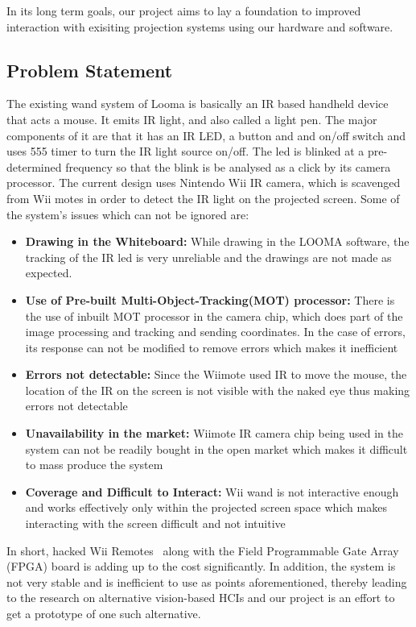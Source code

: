 \documentclass[12pt, a4paper]{article}
\begin{document}
In its long term goals, our project aims to lay a foundation to improved interaction with exisiting projection systems using our hardware and software. 

\subsection{Problem Statement}
The existing wand system of Looma is basically an IR based handheld device that acts a mouse. It emits IR light, and also called a light pen. The major components of it are that it has an IR LED, a button and and on/off switch and uses 555 timer to turn the IR light source on/off. The led is blinked at a pre-determined frequency so that the blink is be analysed as a click by its camera processor. The current design uses Nintendo Wii IR camera, which is scavenged from Wii motes in order to detect the IR light on the projected screen. Some of the system's issues which can not be ignored are:

\begin{itemize}
\item \textbf {Drawing in the Whiteboard:} While drawing in the LOOMA software, the tracking of the IR led is very unreliable and the drawings are not made as expected.
\item \textbf{Use of Pre-built Multi-Object-Tracking(MOT) processor:} There is the use of inbuilt MOT processor in the camera chip, which does part of the image processing and tracking and sending coordinates. In the case of errors, its response can not be modified to remove errors which makes it inefficient
\item \textbf{Errors not detectable:} Since the Wiimote used IR to move the mouse, the location of the IR on the screen is not visible with the naked eye thus making errors not detectable 
\item \textbf{Unavailability in the market:} Wiimote IR camera chip being used in the system can not be readily bought in the open market which makes it difficult to mass produce the system
\item \textbf{Coverage and Difficult to Interact:} Wii wand is not interactive enough and works effectively only within the projected screen space which makes interacting with the screen difficult and not intuitive
\end{itemize}

In short, hacked Wii Remotes~\cite{joh} along with the Field Programmable Gate Array (FPGA) board is adding up to the cost significantly. In addition, the system is not very stable and is inefficient to use as points aforementioned, thereby leading to the research on alternative vision-based HCIs and our project is an effort to get
a prototype of one such alternative.
\end{document}
